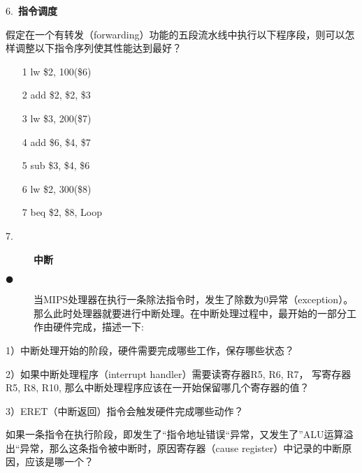 \documentclass{scrbook}
\begin{document}
6.~\textbf{指令调度}\label{mark-6.}

假定在一个有转发（forwarding）功能的五段流水线中执行以下程序段，则可以怎样调整以下指令序列使其性能达到最好？\begin{enumerate}[1]


\item[1] lw \$2, 100(\$6)

\item[2] add \$2, \$2, \$3

\item[3] lw \$3, 200(\$7)

\item[4] add \$6, \$4, \$7

\item[5] sub \$3, \$4, \$6

\item[6] lw \$2, 300(\$8)

\item[7] beq \$2, \$8, Loop

\end{enumerate}

\begin{description}
\item[7.]\textbf{中断}

\item[${\CIRCLE}$]当MIPS处理器在执行一条除法指令时，发生了除数为0异常（exception）。那么此时处理器就要进行中断处理。在中断处理过程中，最开始的一部分工作由硬件完成，描述一下: 


\end{description}


1）中断处理开始的阶段，硬件需要完成哪些工作，保存哪些状态？ 

2）如果中断处理程序（interrupt handler）需要读寄存器R5, R6, R7， 写寄存器R5, R8, R10, 那么中断处理程序应该在一开始保留哪几个寄存器的值？

3）ERET（中断返回）指令会触发硬件完成哪些动作？

如果一条指令在执行阶段，即发生了``指令地址错误``异常，又发生了''ALU运算溢出``异常，那么这条指令被中断时，原因寄存器（cause register）中记录的中断原因，应该是哪一个？
\end{document}
